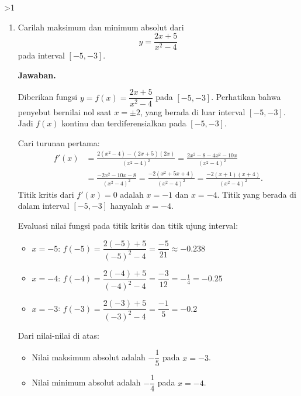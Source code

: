 \documentclass[12pt]{article}
\newcommand{\answername}{Jawaban}
\newenvironment{soaljawab}[1]{%
    \ifnum#1>1\clearpage\fi
    \begin{tcolorbox}[enhanced,breakable,height fill,height fixed for=all,
        sharp corners,colback=white,colframe=black,boxrule=0.4bp,
        boxsep=0pt,left=12bp,right=12bp,top=6bp,bottom=10bp,
        before skip=0pt,after skip=0pt,pad at break=8bp]
    \fontsize{12bp}{14bp}\selectfont
    \setlength{\abovedisplayskip}{8bp}
    \setlength{\belowdisplayskip}{8bp}
    \setlength{\abovedisplayshortskip}{8bp}
    \setlength{\belowdisplayshortskip}{8bp}
    \renewcommand{\arraystretch}{1.15}
    \begin{enumerate}[start=#1,topsep=0pt]
}{%
    \end{enumerate}
    \end{tcolorbox}
}
\newcommand{\jawaban}{\par\medskip\textbf{\answername.}\par\smallskip}
\begin{document}
\begin{soaljawab}{2}
\item Carilah maksimum dan minimum absolut dari
        \[
          y = \frac{2x + 5}{x^2 - 4}
        \]
        pada interval $[-5, -3]$.
\jawaban
Diberikan fungsi $y = f(x) = \dfrac{2x + 5}{x^2 - 4}$ pada $[-5, -3]$.
        Perhatikan bahwa penyebut bernilai nol saat $x = \pm 2$, yang berada di luar interval $[-5, -3]$. Jadi $f(x)$ kontinu dan terdiferensialkan pada $[-5, -3]$.

        Cari turunan pertama:
        \begin{align*}
          f'(x) & = \frac{2(x^2 - 4) - (2x + 5)(2x)}{(x^2 - 4)^2} = \frac{2x^2 - 8 - 4x^2 - 10x}{(x^2 - 4)^2}                          \\
                & = \frac{-2x^2 - 10x - 8}{(x^2 - 4)^2} = \frac{-2(x^2 + 5x + 4)}{(x^2 - 4)^2} = \frac{-2(x + 1)(x + 4)}{(x^2 - 4)^2}.
        \end{align*}
        Titik kritis dari $f'(x) = 0$ adalah $x = -1$ dan $x = -4$.
        Titik yang berada di dalam interval $[-5, -3]$ hanyalah $x = -4$.

        Evaluasi nilai fungsi pada titik kritis dan titik ujung interval:
        \begin{itemize}
          \item $x = -5$: $f(-5) = \dfrac{2(-5) + 5}{(-5)^2 - 4} = \dfrac{-5}{21} \approx -0.238$
          \item $x = -4$: $f(-4) = \dfrac{2(-4) + 5}{(-4)^2 - 4} = \dfrac{-3}{12} = -\frac{1}{4} = -0.25$
          \item $x = -3$: $f(-3) = \dfrac{2(-3) + 5}{(-3)^2 - 4} = \dfrac{-1}{5} = -0.2$
        \end{itemize}
        Dari nilai-nilai di atas:
        \begin{itemize}
          \item Nilai maksimum absolut adalah $-\dfrac{1}{5}$ pada $x = -3$.
          \item Nilai minimum absolut adalah $-\dfrac{1}{4}$ pada $x = -4$.
        \end{itemize}
\end{soaljawab}
\end{document}
